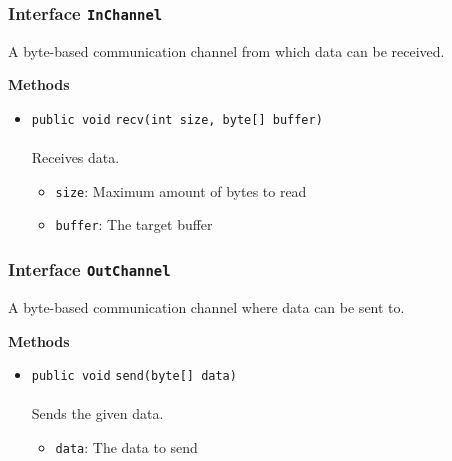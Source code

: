\subsubsection{Interface \lstinline|InChannel|}
A byte-based communication channel from which data can be received. \\
\noindent\begin{minipage}[t]{5cm}
\vspace{0.3em}
\hspace*{2em}
\vspace{0.3em}
\end{minipage}





\textbf{\sffamily Methods}
\begin{itemize}
\item \lstinline|public void| \lstinline|recv|\lstinline|(int size, byte[] buffer)|\\ \\[-0.6em]
Receives data.
\begin{itemize}
\item \lstinline|size|: Maximum amount of bytes to read
\item \lstinline|buffer|: The target buffer
\end{itemize}



\end{itemize}

\subsubsection{Interface \lstinline|OutChannel|}
A byte-based communication channel where data can be sent to. \\
\noindent\begin{minipage}[t]{5cm}
\vspace{0.3em}
\hspace*{2em}
\vspace{0.3em}
\end{minipage}





\textbf{\sffamily Methods}
\begin{itemize}
\item \lstinline|public void| \lstinline|send|\lstinline|(byte[] data)|\\ \\[-0.6em]
Sends the given data.
\begin{itemize}
\item \lstinline|data|: The data to send
\end{itemize}



\end{itemize}



